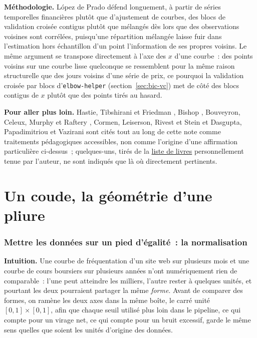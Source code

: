 \documentclass[11pt]{article}
\newcommand{\code}[1]{\texttt{#1}}
\begin{document}
\textbf{Méthodologie.} L\'opez de Prado \citep{lopezdeprado2018financial}
défend longuement, à partir de séries temporelles financières plutôt que
d'ajustement de courbes, des blocs de validation croisée contigus plutôt
que mélangés dès lors que des observations voisines sont corrélées,
puisqu'une répartition mélangée laisse fuir dans l'estimation hors
échantillon d'un point l'information de ses propres voisins. Le même
argument se transpose directement à l'axe des $x$ d'une courbe~: des
points voisins sur une courbe lisse quelconque se ressemblent pour la
même raison structurelle que des jours voisins d'une série de prix, ce
pourquoi la validation croisée par blocs d'\code{elbow-helper}
(section~\ref{sec:bic-vc}) met de côté des blocs contigus de $x$ plutôt
que des points tirés au hasard.

\textbf{Pour aller plus loin.} Hastie, Tibshirani et Friedman
\citep{hastie2009esl}, Bishop \citep{bishop2006prml}, Bouveyron, Celeux,
Murphy et Raftery \citep{bouveyron2021mbc}, Cormen, Leiserson, Rivest et
Stein \citep{cormen2022algorithms} et Dasgupta, Papadimitriou et
Vazirani \citep{dasgupta2006algorithms} sont cités tout au long de cette
note comme traitements pédagogiques accessibles, non comme l'origine
d'une affirmation particulière ci-dessus~; quelques-uns, tirés de la
\href{https://deraison.ai/ai-books}{liste de livres} personnellement
tenue par l'auteur, ne sont indiqués que là où directement pertinents.

\clearpage

\part{Un coude, la géométrie d'une pliure}
\label{part:un}

\section{Mettre les données sur un pied d'égalité~: la normalisation}

\textbf{Intuition.} Une courbe de fréquentation d'un site web sur plusieurs
mois et une courbe de cours boursiers sur plusieurs années n'ont
numériquement rien de comparable~: l'une peut atteindre les milliers,
l'autre rester à quelques unités, et pourtant les deux pourraient partager
la même \emph{forme}. Avant de comparer des formes, on ramène les deux axes
dans la même boîte, le carré unité $[0,1] \times [0,1]$, afin que chaque
seuil utilisé plus loin dans le pipeline, ce qui compte pour un virage net,
ce qui compte pour un bruit excessif, garde le même sens quelles que soient
les unités d'origine des données.
\end{document}
